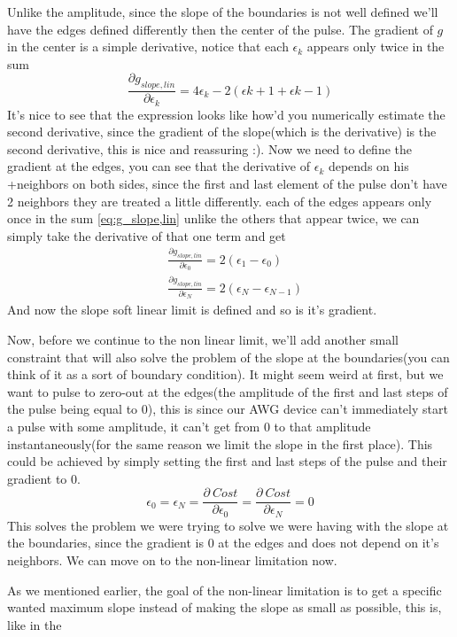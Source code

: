 \documentclass[english, a4paper, 12pt, twoside]{article}
\numberwithin{equation}{section} %
\begin{document}
Unlike the amplitude, since the slope of the boundaries is not well defined we'll have the edges defined differently then the center of the pulse. The gradient of \(g\) in the center is a simple derivative, notice that each \(\epsilon_k\) appears only twice in the sum
\[
    \frac{\partial g_{slope, lin}}{\partial \epsilon_k} = 4\epsilon_k - 2(\epsilon{k+1} + \epsilon{k-1})
\]
It's nice to see that the expression looks like how'd you numerically estimate the second derivative, since the gradient of the slope(which is the derivative) is the second derivative, this is nice and reassuring :). Now we need to define the gradient at the edges, you can see that the derivative of \(\epsilon_k\) depends on his 
+neighbors on both sides, since the first and last element of the pulse don't have 2 neighbors they are treated a little differently. each of the edges appears only once in the sum \ref{eq:g_slope,lin} unlike the others that appear twice, we can simply take the derivative of that one term and get
\begin{align*}
    &\frac{\partial g_{slope, lin}}{\partial \epsilon_0} = 2(\epsilon_1 - \epsilon_0) \\
    &\frac{\partial g_{slope, lin}}{\partial \epsilon_N} = 2(\epsilon_N - \epsilon_{N-1})
\end{align*} %
And now the slope soft linear limit is defined and so is it's gradient.

Now, before we continue to the non linear limit, we'll add another small constraint that will also solve the problem of the slope at the boundaries(you can think of it as a sort of boundary condition). It might seem weird at first, but we want to pulse to zero-out at the edges(the amplitude of the first and last steps of the pulse being equal to 0), this is since our AWG device can't immediately start a pulse with some amplitude, it can't get from 0 to that amplitude instantaneously(for the same reason we limit the slope in the first place). This could be achieved by simply setting the first and last steps of the pulse and their gradient to 0.
\[
    \epsilon_0 = \epsilon_N = \frac{\partial \ Cost}{\partial \epsilon_0} = \frac{\partial \ Cost}{\partial \epsilon_N} = 0
\]
This solves the problem we were trying to solve we were having with the slope at the boundaries, since the gradient is 0 at the edges and does not depend on it's neighbors. We can move on to the non-linear limitation now.

As we mentioned earlier, the goal of the non-linear limitation is to get a specific wanted maximum slope instead of making the slope as small as possible, this is, like in the 
\end{document}
